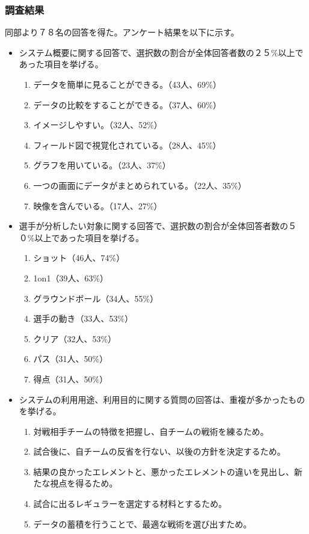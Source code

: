 \documentclass[sotsuron]{kuee}
\begin{document}
			\subsubsection{調査結果}
				同部より７８名の回答を得た。アンケート結果を以下に示す。
				\begin{itemize}
				\item システム概要に関する回答で、選択数の割合が全体回答者数の２５\%以上であった項目を挙げる。
					\begin{enumerate}
					\item データを簡単に見ることができる。（43人、69\%）
					\item データの比較をすることができる。（37人、60\%）
					\item イメージしやすい。（32人、52\%）
					\item フィールド図で視覚化されている。（28人、45\%）
					\item グラフを用いている。（23人、37\%）
					\item 一つの画面にデータがまとめられている。（22人、35\%）
					\item 映像を含んでいる。（17人、27\%）
					\end{enumerate}
				\item 選手が分析したい対象に関する回答で、選択数の割合が全体回答者数の５０\%以上であった項目を挙げる。
					\begin{enumerate}
					\item ショット（46人、74\%）
					\item 1on1（39人、63\%）
					\item グラウンドボール（34人、55\%）
					\item 選手の動き（33人、53\%）
					\item クリア（32人、53\%）
					\item パス（31人、50\%）
					\item 得点（31人、50\%）
					\end{enumerate}
				\item システムの利用用途、利用目的に関する質問の回答は、重複が多かったものを挙げる。
					\begin{enumerate}
					\item 対戦相手チームの特徴を把握し、自チームの戦術を練るため。
					\item 試合後に、自チームの反省を行ない、以後の方針を決定するため。
					\item 結果の良かったエレメントと、悪かったエレメントの違いを見出し、新たな視点を得るため。
					\item 試合に出るレギュラーを選定する材料とするため。
					\item データの蓄積を行うことで、最適な戦術を選び出すため。
					\end{enumerate}
				\end{itemize}
\end{document}
